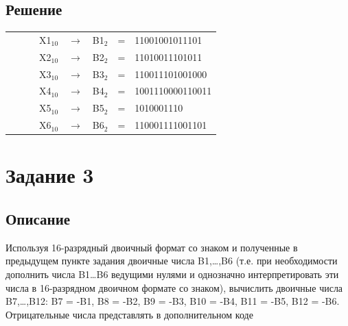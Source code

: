 \documentclass[11pt]{article}
\begin{document}
\subsection{Решение}
\label{sec:org24bbd1e}
\setlength{\tabcolsep}{3pt}
\label{tab:org3faa3c4}
\begin{tabular}{llllclcl}
 &  &  & X1\(_{\text{10}}\) & \(\to\) & B1\(_{\text{2}}\) & = & 11001001011101\\
 &  &  & X2\(_{\text{10}}\) & \(\to\) & B2\(_{\text{2}}\) & = & 11010011101011\\
 &  &  & X3\(_{\text{10}}\) & \(\to\) & B3\(_{\text{2}}\) & = & 110011101001000\\
 &  &  & X4\(_{\text{10}}\) & \(\to\) & B4\(_{\text{2}}\) & = & 1001110000110011\\
 &  &  & X5\(_{\text{10}}\) & \(\to\) & B5\(_{\text{2}}\) & = & 1010001110\\
 &  &  & X6\(_{\text{10}}\) & \(\to\) & B6\(_{\text{2}}\) & = & 110001111001101\\
\end{tabular}

\section{Задание 3}
\label{sec:org8fa4be1}
\subsection{Описание}
\label{sec:orgb0c147e}
Используя 16-разрядный двоичный формат со знаком и полученные в предыдущем пункте задания двоичные числа B1,…,B6 (т.е. при необходимости дополнить числа B1…B6 ведущими нулями и однозначно интерпретировать эти числа в 16-разрядном двоичном формате со знаком), вычислить двоичные числа B7,…,B12: B7 = -B1, B8 = -B2, B9 = -B3, B10 = -B4, B11 = -B5, B12 = -B6. Отрицательные числа представлять в дополнительном коде
\end{document}

